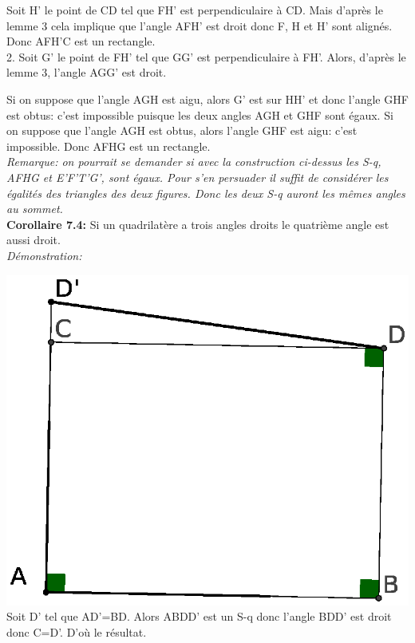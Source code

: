 \documentclass[a4paper, 12pt, twoside]{book}
\begin{document}
   Soit H' le point de CD tel que FH' est perpendiculaire à CD. Mais d'après le lemme 3 cela implique que l'angle AFH' est droit donc F, H et H' sont alignés. Donc AFH'C est un rectangle.\\
   
2. Soit G' le point de FH' tel que GG' est perpendiculaire à FH'. Alors, d'après le lemme 3, l'angle AGG' est droit.\

 Si on suppose que l'angle AGH est aigu, alors G' est sur HH' et donc l'angle GHF est obtus: c'est impossible puisque les deux angles AGH et GHF sont égaux. Si on suppose que l'angle AGH est obtus, alors l'angle GHF est aigu: c'est impossible. Donc AFHG est un rectangle. \\

\textit{Remarque: on pourrait se demander si avec la construction ci-dessus les S-q, AFHG et E'F'T'G', sont égaux. Pour s'en persuader il suffit de considérer les égalités des triangles des deux figures. Donc les deux S-q auront les mêmes angles au sommet.}\\

\textbf{Corollaire 7.4:} Si un quadrilatère a trois angles droits le quatrième angle est aussi droit.\\

\textit{Démonstration:}\

\includegraphics[scale=0.5]{figures/saccheri7.eps}\\

Soit D' tel que AD'=BD. Alors ABDD' est un S-q donc l'angle BDD' est droit donc C=D'. D'où le résultat.\\
\end{document}
